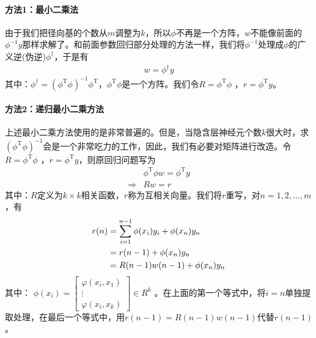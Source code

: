 {            \paragraph{方法1：最小二乘法}由于我们把径向基的个数从$m$调整为$k$，所以$\phi$不再是一个方阵，$w$不能像前面的$\phi^{-1}y$那样求解了。和前面参数回归部分处理的方法一样，我们将$\phi^{-1}$处理成$\phi$的广义逆(伪逆)$\phi^\dag$，于是有
            \begin{align*}
            w= \phi^\dag y
            \end{align*}
            其中：$\phi^\dag = (\phi^\mathrm{T}\phi)^{-1}\phi^\mathrm{T}$，$\phi^\mathrm{T}\phi$是一个方阵。我们令$R = \phi^\mathrm{T}\phi$ ，$r= \phi^\mathrm{T}y$。
            \paragraph{方法2：递归最小二乘方法}上述最小二乘方法使用的是非常普遍的。但是，当隐含层神经元个数$k$很大时，求$(\phi^\mathrm{T}\phi)^{-1}$会是一个非常吃力的工作，因此，我们有必要对矩阵进行改造。令$R = \phi^\mathrm{T}\phi$ ，$r= \phi^\mathrm{T}y$，则原回归问题写为
            \begin{align*}
            &\phi^\mathrm{T}\phi w = \phi^\mathrm{T}y \\
            \Rightarrow{} &Rw = r
            \end{align*}
            其中：$R$定义为$k\times k$相关函数，$r$称为互相关向量。我们将$r$重写，对$n = 1,2,\dots,m$，有
            \begin{align}
            \label{r计算公式1}
            r(n) & = \sum_{i=1}^{n-1} \phi(x_i)y_i + \phi(x_n)y_n\notag \\
            & =r(n-1)+\phi(x_n)y_n\notag\\
            & =R(n-1)w(n-1)+\phi(x_n)y_n
            \end{align}
            其中：
            \begin{math}
            \phi(x_i) =
            \left[
             \begin{smallmatrix}
            \varphi(x_i,x_1)\\
            \vdots\\
            \varphi(x_i,x_k)
            \end{smallmatrix}
             \right] \in R^k
            \end{math}
            。在上面的第一个等式中，将$i=n$单独提取处理，在最后一个等式中，用$r(n-1) = R(n-1)w(n-1)$代替$r(n-1)$。
            \par
}
